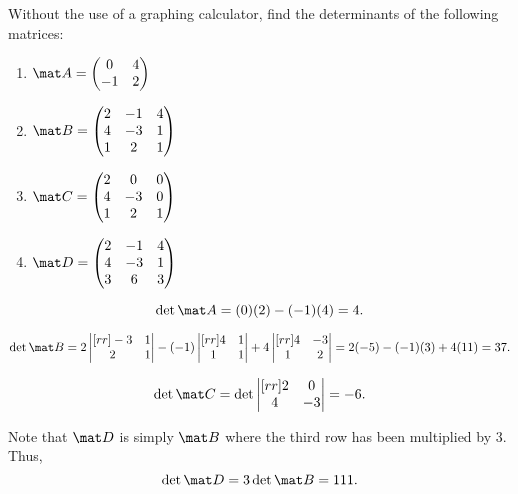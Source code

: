 \begin{problem}
    Without the use of a graphing calculator, find the determinants of the following matrices:
    \begin{enumerate}
        \item $\mat A = \begin{pmatrix}
            0 & 4 \\ -1 & 2
        \end{pmatrix}$
        \item $\mat B = \begin{pmatrix}
            2 & -1 & 4 \\ 4 & -3 & 1 \\ 1 & 2 & 1
        \end{pmatrix}$
        \item $\mat C = \begin{pmatrix}
            2 & 0 & 0 \\ 4 & -3 & 0 \\ 1 & 2 & 1
        \end{pmatrix}$
        \item $\mat D = \begin{pmatrix}
            2 & -1 & 4 \\ 4 & -3 & 1 \\ 3 & 6 & 3
        \end{pmatrix}$
    \end{enumerate}
\end{problem}
\begin{solution}
    \begin{ppart}
        \[\det \mat A = (0)(2) - (-1)(4) = 4.\]
    \end{ppart}
    \begin{ppart}
        \[\det \mat B = 2 \begin{vmatrix}[rr]-3 & 1 \\ 2 & 1\end{vmatrix} - (-1) \begin{vmatrix}[rr]4 & 1 \\ 1 & 1\end{vmatrix} + 4 \begin{vmatrix}[rr]4 & -3 \\ 1 & 2\end{vmatrix} = 2(-5) - (-1)(3) + 4(11) = 37.\]
    \end{ppart}
    \begin{ppart}
        \[\det \mat C = \det \begin{vmatrix}[rr]2 & 0 \\ 4 & -3\end{vmatrix} = -6.\]
    \end{ppart}
    \begin{ppart}
        Note that $\mat D$ is simply $\mat B$ where the third row has been multiplied by 3. Thus, \[\det \mat D = 3 \det \mat B = 111.\]
    \end{ppart}
\end{solution}

